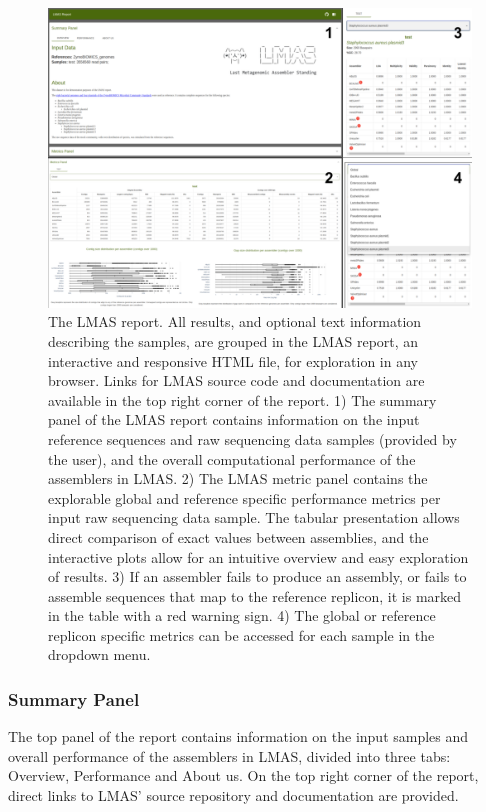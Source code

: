 \begin{figure}[h!]
\centering
\includegraphics[width=\textwidth]{figures/chapter 5/Figure 2.png}
\caption{The LMAS report.  All results, and optional text information describing the samples, are grouped in the LMAS report, an interactive and responsive HTML file,  for exploration in any browser. Links for LMAS source code and documentation are available in the top right corner of the report. 1) The summary panel of the LMAS report contains information on the input reference sequences and raw sequencing data samples (provided by the user), and the overall computational performance of the assemblers in LMAS. 2) The LMAS metric panel contains the explorable global and reference specific performance metrics per input raw sequencing data sample.  The tabular presentation allows direct comparison of exact values between assemblies, and the interactive plots allow for an intuitive overview and easy exploration of results. 3) If an assembler fails to produce an assembly, or fails to assemble sequences that map to the reference replicon, it is marked in the table with a red warning sign. 4) The global or reference replicon specific metrics can be accessed for each sample in the dropdown menu.}
\label{fig:chap5_figure2}
\end{figure}

\subsubsection{Summary Panel} \label{sssec:_chap5_summary_panel}

The top panel of the report contains information on the input samples and overall performance of the assemblers in LMAS, divided into three tabs:  Overview, Performance and About us. On the top right corner of the report, direct links to LMAS’ source repository and documentation are provided.

